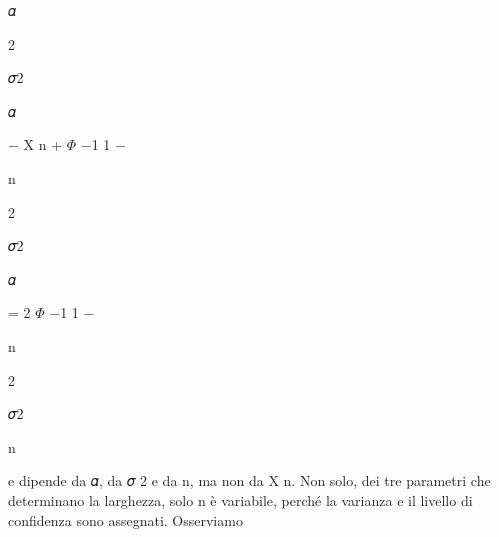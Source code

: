 \documentclass[a4paper,portrait,12pt]{article}
\begin{document}
\begin{flushleft}
𝛼
\end{flushleft}


2





\begin{flushleft}
𝜎2
\end{flushleft}


\begin{flushleft}
𝛼
\end{flushleft}


\begin{flushleft}
$-$ X n + $\Phi$ $-$1 1 $-$
\end{flushleft}


\begin{flushleft}
n
\end{flushleft}


2





\begin{flushleft}
𝜎2
\end{flushleft}


\begin{flushleft}
𝛼
\end{flushleft}


\begin{flushleft}
= 2 $\Phi$ $-$1 1 $-$
\end{flushleft}


\begin{flushleft}
n
\end{flushleft}


2





\begin{flushleft}
𝜎2
\end{flushleft}


\begin{flushleft}
n
\end{flushleft}





\begin{flushleft}
e dipende da 𝛼, da 𝜎 2 e da n, ma non da X n. Non solo, dei tre parametri che determinano la larghezza, solo n \`{e} variabile, perch\'{e} la varianza e il livello di confidenza sono assegnati. Osserviamo
\end{flushleft}
\end{document}
